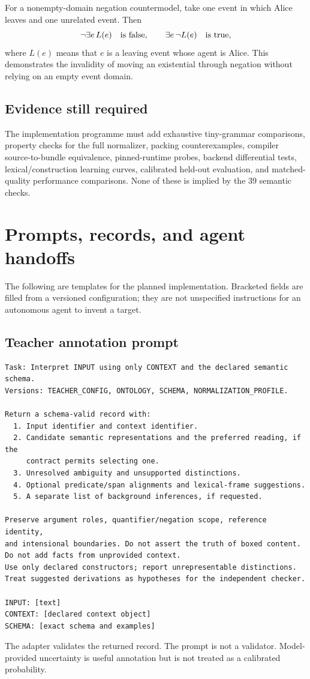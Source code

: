 \documentclass[11pt,a4paper]{article}
\begin{document}
For a nonempty-domain negation countermodel, take one event in which Alice
leaves and one unrelated event. Then
\[
 \neg\exists e\,L(e)\quad\hbox{is false},\qquad
 \exists e\,\neg L(e)\quad\hbox{is true},
\]
where \(L(e)\) means that \(e\) is a leaving event whose agent is Alice.
This demonstrates the invalidity of moving an existential through negation
without relying on an empty event domain.

\subsection{Evidence still required}
The implementation programme must add exhaustive tiny-grammar comparisons,
property checks for the full normalizer, packing counterexamples, compiler
source-to-bundle equivalence, pinned-runtime probes, backend differential
tests, lexical/construction learning curves, calibrated held-out evaluation,
and matched-quality performance comparisons. None of these is implied by
the 39 semantic checks.

\clearpage
\section{Prompts, records, and agent handoffs}\label{app:prompts}

The following are templates for the planned implementation. Bracketed fields
are filled from a versioned configuration; they are not unspecified
instructions for an autonomous agent to invent a target.

\subsection{Teacher annotation prompt}
\begin{lstlisting}
Task: Interpret INPUT using only CONTEXT and the declared semantic schema.
Versions: TEACHER_CONFIG, ONTOLOGY, SCHEMA, NORMALIZATION_PROFILE.

Return a schema-valid record with:
  1. Input identifier and context identifier.
  2. Candidate semantic representations and the preferred reading, if the
     contract permits selecting one.
  3. Unresolved ambiguity and unsupported distinctions.
  4. Optional predicate/span alignments and lexical-frame suggestions.
  5. A separate list of background inferences, if requested.

Preserve argument roles, quantifier/negation scope, reference identity,
and intensional boundaries. Do not assert the truth of boxed content.
Do not add facts from unprovided context.
Use only declared constructors; report unrepresentable distinctions.
Treat suggested derivations as hypotheses for the independent checker.

INPUT: [text]
CONTEXT: [declared context object]
SCHEMA: [exact schema and examples]
\end{lstlisting}
The adapter validates the returned record. The prompt is not a validator.
Model-provided uncertainty is useful annotation but is not treated as a
calibrated probability.
\end{document}
